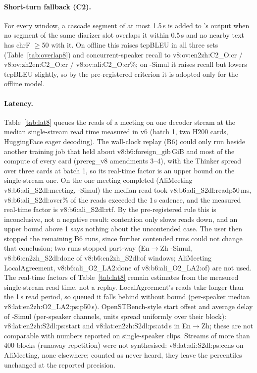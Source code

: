 \paragraph{Short-turn fallback (C2).} For every window, a cascade segment of at most 1.5\,s is added to \sys{}'s output
when no \sys{} segment of the same diarizer slot overlaps it within 0.5\,s and no nearby \sys{} text has chrF $\ge$50 with
it. On offline \sys{} this raises tcpBLEU in all three sets (Table~\ref{tab:overlap8}) and concurrent-speaker recall to
\num{v8:ov:en2zh:C2_O:cr} / \num{v8:ov:zh2en:C2_O:cr} / \num{v8:ov:ali:C2_O:cr}\%; on \sys{}-Simul it raises recall but
lowers tcpBLEU slightly, so by the pre-registered criterion it is adopted only for the offline model.

\paragraph{Latency.} Table~\ref{tab:lat8} queues the reads of a meeting on one decoder stream at the median single-stream
read time measured in v6 (batch 1, two H200 cards, HuggingFace eager decoding). The wall-clock replay (B6) could only run beside another
training job that held about \num{v8:b6:foreign_gib}\,GiB and most of the compute of every card (prereg\_v8 amendments 3--4),
with the Thinker spread over three cards at batch 1, so its real-time factor is an upper bound on the single-stream one.
On the one meeting completed (AliMeeting \num{v8:b6:ali_S2dl:meeting}, \sys{}-Simul) the median read took
\num{v8:b6:ali_S2dl:readp50}\,ms, \num{v8:b6:ali_S2dl:over}\% of the reads exceeded the 1\,s cadence, and the measured
real-time factor is \num{v8:b6:ali_S2dl:rtf}. By the pre-registered rule this is inconclusive, not a negative result:
contention only slows reads down, and an upper bound above 1 says nothing about the uncontended case. The user then
stopped the remaining B6 runs, since further contended runs could not change that conclusion; two runs stopped part-way
(En$\rightarrow$Zh \sys{}-Simul, \num{v8:b6:en2zh_S2dl:done} of \num{v8:b6:en2zh_S2dl:of} windows; AliMeeting LocalAgreement,
\num{v8:b6:ali_O2_LA2:done} of \num{v8:b6:ali_O2_LA2:of}) are not used. The real-time factors of Table~\ref{tab:lat8} remain
estimates from the measured single-stream read time, not a replay. LocalAgreement's reads take longer than the 1\,s read period, so queued it falls
behind without bound (per-speaker median \num{v8:lat:en2zh:O2_LA2:ps:p50}\,s). OpenSTBench-style start offset and
average delay of \sys{}-Simul (per-speaker channels, units spread uniformly over their block): \num{v8:lat:en2zh:S2dl:ps:start} and
\num{v8:lat:en2zh:S2dl:ps:atd}\,s in En$\rightarrow$Zh; these are not comparable with numbers reported on single-speaker
clips. Streams of more than 400 blocks (runaway repetition) were not synthesised: \num{v8:lat:ali:S2dl:ps:cens} on
AliMeeting, none elsewhere; counted as never heard, they leave the percentiles unchanged at the reported precision.

